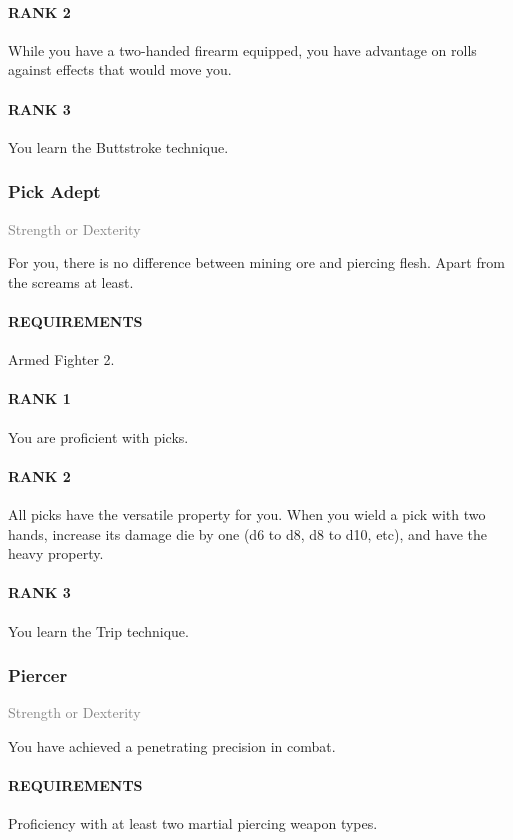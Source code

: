 \paragraph{RANK 2} While you have a two-handed firearm equipped, you have advantage on rolls against effects that would move you.
\paragraph{RANK 3} You learn the Buttstroke technique.

\subsubsection{Pick Adept} \label{feat::pickadept}
\small{\textcolor{gray}{Strength or Dexterity}}

\normalsize
For you, there is no difference between mining ore and piercing flesh.
Apart from the screams at least.
\paragraph{REQUIREMENTS} Armed Fighter 2.
\paragraph{RANK 1} You are proficient with picks.
\paragraph{RANK 2} All picks have the versatile property for you.
When you wield a pick with two hands, increase its damage die by one (d6 to d8, d8 to d10, etc), and have the heavy property.
\paragraph{RANK 3} You learn the Trip technique.

\subsubsection{Piercer} \label{feat::piercer}
\small{\textcolor{gray}{Strength or Dexterity}}

\normalsize
You have achieved a penetrating precision in combat.
\paragraph{REQUIREMENTS} Proficiency with at least two martial piercing weapon types.
